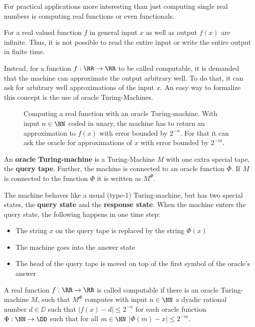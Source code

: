 For practical applications more interesting than just computing single real numbers is computing real
functions or even functionals.

For a real valued function $f$ in general input $x$ as well as
output $f(x)$ are infinite. 
Thus, it is not possible to read the entire input or write the entire output in
finite time.

Instead, for a function $f: \RR \to \RR$ to be called computable, it is
demanded that the machine can approximate the output arbitrary well.
To do that, it can ask for arbitrary well approximations of the input $x$.
An easy way to formalize this concept is the use of oracle Turing-Machines.
\begin{figure}
  \centering
  
  \caption{Computing a real function with an oracle Turing-machine. With input
  $n \in \NN$ coded in unary, the machine has to return an approximation to
  $f(x)$ with error bounded by $2^{-n}$. For that it can ask the oracle for
  approximations of $x$ with error bounded by $2^{-m}$.
  }
\end{figure}
\begin{definition}\label{def:computability_oracle_tm}
 An \textbf{oracle Turing-machine} is a Turing-Machine $M$ with one extra special
 tape, the \textbf{query tape}. Further, the machine is connected to an oracle
 function $\Phi$.
 If $M$ is connected to the function $\Phi$ it is written as $M^\Phi$. 

 The machine behaves like a usual (type-1) Turing-machine, but has two special
 states, the \textbf{query state} and the \textbf{response state}. 
 When the machine enters the query state, the following happens in one time
 step: 
 \begin{itemize}
    \item The string $x$ on the query tape is replaced by the string $\Phi(x)$
    \item The machine goes into the answer state
    \item The head of the query tape is moved on top of the first symbol of the
      oracle's answer
  \end{itemize}

 A real function $f: \RR \to \RR$ is called computable if there is an oracle
 Turing-machine $M$, such that $M^\Phi$ computes with input $n \in \NN$ a dyadic rational
 number $d \in \DD$ such that $| f(x) - d | \leq 2^{-n}$ for each oracle function
 $\Phi: \NN \to \DD$ such that for all $m \in \NN$ $|\Phi(m) - x| \leq 2^{-m}$.   
\end{definition}
